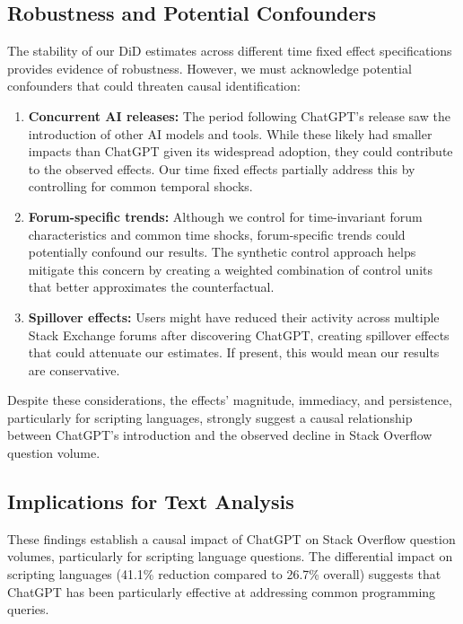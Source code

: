 
\subsection{Robustness and Potential Confounders}

The stability of our DiD estimates across different time fixed effect specifications provides evidence of robustness. However, we must acknowledge potential confounders that could threaten causal identification:

\begin{enumerate}
    \item \textbf{Concurrent AI releases:} The period following ChatGPT's release saw the introduction of other AI models and tools. While these likely had smaller impacts than ChatGPT given its widespread adoption, they could contribute to the observed effects. Our time fixed effects partially address this by controlling for common temporal shocks.
    \item \textbf{Forum-specific trends:} Although we control for time-invariant forum characteristics and common time shocks, forum-specific trends could potentially confound our results. The synthetic control approach helps mitigate this concern by creating a weighted combination of control units that better approximates the counterfactual.
    \item \textbf{Spillover effects:} Users might have reduced their activity across multiple Stack Exchange forums after discovering ChatGPT, creating spillover effects that could attenuate our estimates. If present, this would mean our results are conservative.
\end{enumerate}

Despite these considerations, the effects' magnitude, immediacy, and persistence, particularly for scripting languages, strongly suggest a causal relationship between ChatGPT's introduction and the observed decline in Stack Overflow question volume.


\subsection{Implications for Text Analysis}

These findings establish a causal impact of ChatGPT on Stack Overflow question volumes, particularly for scripting language questions. The differential impact on scripting languages (41.1\% reduction compared to 26.7\% overall) suggests that ChatGPT has been particularly effective at addressing common programming queries.

